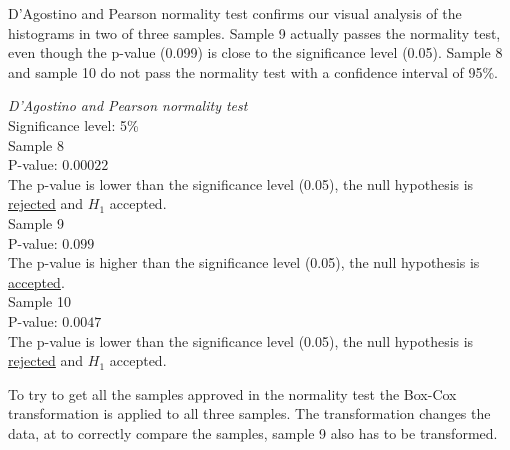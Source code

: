  D'Agostino and Pearson normality test confirms our visual analysis of the histograms in two of three samples. Sample 9 actually passes the normality test, even though the p-value (0.099) is close to the significance level (0.05). Sample 8 and sample 10 do not pass the normality test with a confidence interval of 95\%. \\[0.2cm]
 
 \begin{center}
 	\begin{tcolorbox}[box align=center,width=\textwidth-5cm]
 		\centering
 		\textit{D'Agostino and Pearson normality test}\\
 		Significance level: 5\%  \\[0.5cm]
 		
 		Sample 8 \\
 		P-value: $0.00022$\\
 		The p-value is lower than the significance level (0.05), the null hypothesis is \underline{rejected} and $H_1$ accepted.\\[0.5cm]
 		
 		Sample 9 \\
 		P-value: $0.099$ \\
 		The p-value is higher than the significance level (0.05), the null hypothesis is \underline{accepted}. \\[0.5cm]
 		
 		Sample 10 \\
 		P-value: $0.0047$ \\
 		The p-value is lower than the significance level (0.05), the null hypothesis is \underline{rejected} and $H_1$ accepted.\\[0.5cm]
 	\end{tcolorbox} 
 \end{center}

\vspace{0.2cm}

To try to get all the samples approved in the normality test the Box-Cox transformation is applied to all three samples. The transformation changes the data, at to correctly compare the samples, sample 9 also has to be transformed. \\[0.2cm]


